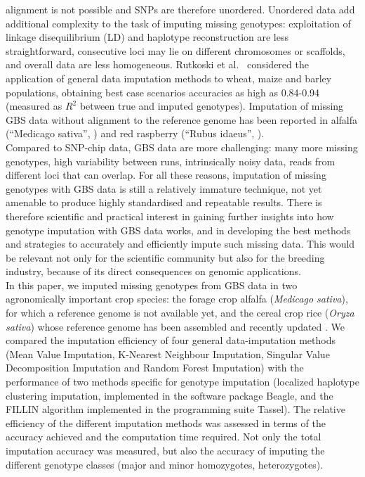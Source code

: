 alignment is not possible and SNPs are therefore unordered. Unordered 
data add additional complexity to the task of imputing missing genotypes: 
exploitation of linkage disequilibrium (LD) and haplotype reconstruction 
are less straightforward, consecutive loci may lie on different chromosomes
or scaffolds, and overall data are less homogeneous. Rutkoski et al.~\cite{rutkoski_imputation_2013}
considered the application of general data imputation methods 
to wheat, maize and barley populations, obtaining best case scenarios accuracies 
as high as 0.84-0.94 (measured as $R^{2}$ between true and imputed genotypes). Imputation of missing GBS data without alignment to the reference genome has been reported in alfalfa (``Medicago sativa'', \cite{Rocher_validation_2015}) and red raspberry (``Rubus idaeus'', \cite{ward2013}).\\
Compared to SNP-chip data, GBS data are more challenging: many more 
missing genotypes, high variability between runs, intrinsically noisy data, 
reads from different loci that can overlap. For all these reasons, imputation 
of missing genotypes with GBS data is still a relatively immature technique, 
not yet amenable to produce highly standardised and repeatable results. 
There is therefore scientific and practical interest in gaining further 
insights into how genotype imputation with GBS data works, and in 
developing the best methods and strategies to accurately and efficiently 
impute such missing data. This would be relevant not only for the scientific 
community but also for the breeding industry, because of its direct 
consequences on genomic applications.\\
In this paper, we imputed missing genotypes from GBS data in two agronomically
important crop species: the forage crop alfalfa (\emph{Medicago sativa}), for 
which a reference genome is not available yet, and the 
cereal crop rice (\emph{Oryza sativa}) whose reference genome has been 
assembled \cite{international_rice_genome_sequencing_project_map-based_2005} and
recently updated \cite{kawahara_improvement_2013}. We compared the imputation 
efficiency of four general data-imputation methods (Mean Value Imputation, 
K-Nearest Neighbour Imputation, Singular Value Decomposition Imputation 
and Random Forest Imputation) with the performance of two methods specific 
for genotype imputation (localized haplotype clustering imputation, 
implemented in the software package Beagle, %
and the FILLIN algorithm implemented in the programming suite Tassel). The relative efficiency of 
the different imputation methods was assessed in terms of the 
accuracy achieved and the computation time required. Not only the total imputation accuracy was measured, but also the accuracy of imputing the different genotype classes (major and minor homozygotes, heterozygotes).\\
